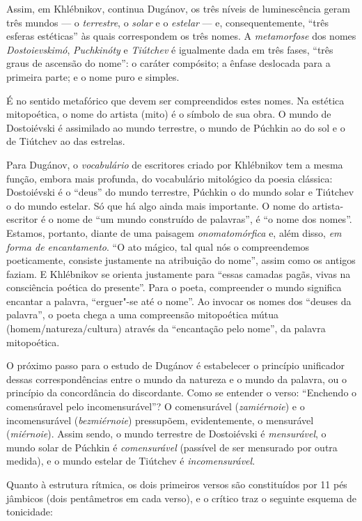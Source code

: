 Assim, em Khlébnikov, continua Dugánov, os três níveis de
luminescência geram três mundos --- o \emph{terrestre}, o \emph{solar}
e o \emph{estelar} --- e, consequentemente, ``três esferas estéticas'' às quais
correspondem os três nomes. A \emph{metamorfose} dos nomes \emph{Dostoievskimó},
\emph{Puchkinóty} e \emph{Tiútchev} é igualmente dada em três fases, ``três
graus de ascensão do nome'': o caráter compósito; a ênfase deslocada para a primeira parte; e
o nome puro e simples.

É no sentido metafórico que devem ser compreendidos estes nomes. Na
estética mitopoética, o nome do artista (mito) é o símbolo de sua obra. O mundo
de Dostoiévski é assimilado ao mundo terrestre, o mundo de Púchkin ao do
sol e o de Tiútchev ao das estrelas. 

Para Dugánov, o \emph{vocabulário} de escritores criado por
Khlébnikov tem a mesma função, embora mais profunda, do vocabulário mitológico da poesia
clássica: Dostoiévski é o ``deus'' do mundo terrestre, Púchkin o do mundo
solar e Tiútchev o do mundo estelar. Só que há algo ainda mais importante. O nome do artista-escritor é o nome de
``um mundo construído de palavras'', é ``o nome dos nomes''. Estamos, portanto,
diante de uma paisagem \emph{onomatomórfica} e, além disso,
\emph{em forma de encantamento}. ``O ato mágico, tal qual
nós o compreendemos poeticamente, consiste justamente na
atribuição do nome'', assim como os antigos faziam. E Khlébnikov se orienta justamente para
``essas camadas pagãs, vivas na consciência poética do presente''. Para o poeta,
compreender o mundo significa encantar a palavra, ``erguer"-se até o nome''.
Ao invocar os nomes dos ``deuses da palavra'', o poeta chega a uma compreensão mitopoética
mútua (homem/natureza/cultura) através da ``encantação pelo nome'', da palavra mitopoética.

O próximo passo para o estudo de Dugánov é estabelecer o princípio
unificador dessas correspondências entre o mundo da natureza e o mundo
da palavra, ou o princípio da concordância do discordante. Como se
entender o verso: ``Enchendo o comensúravel pelo incomensurável''? O
comensurável (\emph{zamiérnoie}) e o incomensurável (\emph{bezmiérnoie})
pressupõem, evidentemente, o mensurável (\emph{miérnoie}). Assim sendo,
o mundo terrestre de Dostoiévski é \emph{mensurável}, o mundo solar de
Púchkin é \emph{comensurável} (passível de ser mensurado por outra
medida), e o mundo estelar de Tiútchev é \emph{incomensurável}.

Quanto à estrutura rítmica, os dois primeiros versos são constituídos
por 11 pés jâmbicos (dois pentâmetros em cada verso), e o crítico traz o
seguinte esquema de tonicidade:

